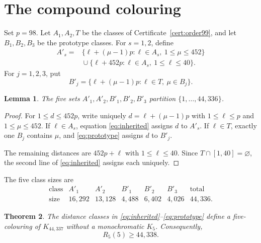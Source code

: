\documentclass[11pt]{article}
\newtheorem{theorem}{Theorem}[section]
\newtheorem{lemma}[theorem]{Lemma}
\theoremstyle{definition}
\theoremstyle{remark}
\newcommand{\Rfive}{R_5(5)}
\begin{document}
\section{The compound colouring}

Set $p=98$. Let $A_1,A_2,T$ be the classes of
Certificate~\ref{cert:order99}, and let $B_1,B_2,B_3$ be the prototype
classes. For $s=1,2$, define
\begin{equation}
\begin{split}
A'_s={}&
\{\ell+(\mu-1)p:\ell\in A_s,\ 1\le\mu\le452\}\\
&{}\cup
\{\ell+452p:\ell\in A_s,\ 1\le\ell\le40\}.
\end{split}
\label{eq:inherited}
\end{equation}
For $j=1,2,3$, put
\begin{equation}
  B'_j=\{\ell+(\mu-1)p:\ell\in T,\ \mu\in B_j\}.
  \label{eq:prototype}
\end{equation}

\begin{lemma}
\label{lem:partition}
The five sets $A'_1,A'_2,B'_1,B'_2,B'_3$ partition
$\{1,\ldots,44{,}336\}$.
\end{lemma}

\begin{proof}
For $1\le d\le452p$, write uniquely
$d=\ell+(\mu-1)p$ with $1\le\ell\le p$ and
$1\le\mu\le452$. If $\ell\in A_s$, equation \eqref{eq:inherited} assigns
$d$ to $A'_s$. If $\ell\in T$, exactly one $B_j$ contains $\mu$, and
\eqref{eq:prototype} assigns $d$ to $B'_j$.

The remaining distances are $452p+\ell$ with $1\le\ell\le40$. Since
$T\cap[1,40]=\varnothing$, the second line of
\eqref{eq:inherited} assigns each uniquely.
\end{proof}

The five class sizes are
\[
\begin{array}{c|rrrrr|r}
\text{class}&A'_1&A'_2&B'_1&B'_2&B'_3&\text{total}\\ \hline
\text{size}&16{,}292&13{,}128&4{,}488&6{,}402&4{,}026&44{,}336.
\end{array}
\]

\begin{theorem}
\label{thm:main}
The distance classes in \eqref{eq:inherited}--\eqref{eq:prototype} define a
five-colouring of $K_{44,337}$ without a monochromatic $K_5$. Consequently,
\[
  \Rfive\ge44{,}338.
\]
\end{theorem}
\end{document}
